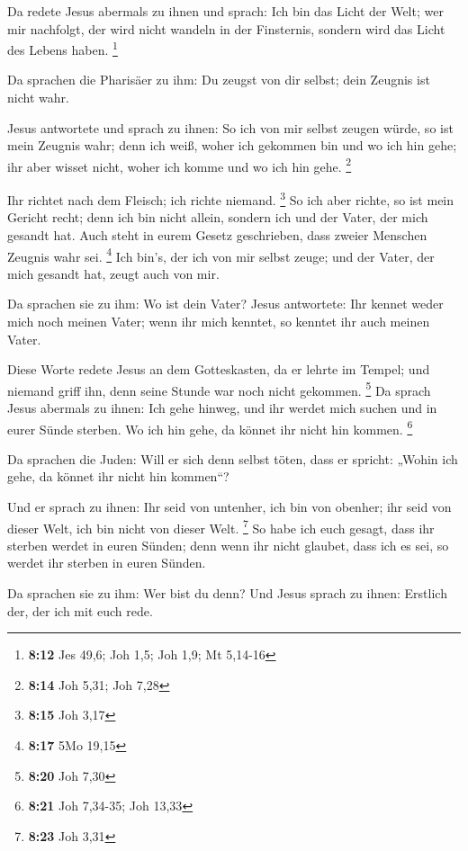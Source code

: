  Da redete Jesus abermals zu ihnen und sprach: Ich bin das
Licht der Welt; wer mir nachfolgt, der wird nicht wandeln in der
Finsternis, sondern wird das Licht des Lebens haben. \footnote{\textbf{8:12}
  Jes 49,6; Joh 1,5; Joh 1,9; Mt 5,14-16}

 Da sprachen die Pharisäer zu ihm: Du zeugst von dir
selbst; dein Zeugnis ist nicht wahr.

 Jesus antwortete und sprach zu ihnen: So ich von mir
selbst zeugen würde, so ist mein Zeugnis wahr; denn ich weiß, woher ich
gekommen bin und wo ich hin gehe; ihr aber wisset nicht, woher ich komme
und wo ich hin gehe. \footnote{\textbf{8:14} Joh 5,31; Joh 7,28}

 Ihr richtet nach dem Fleisch; ich richte niemand.
\footnote{\textbf{8:15} Joh 3,17}  So ich aber richte, so
ist mein Gericht recht; denn ich bin nicht allein, sondern ich und der
Vater, der mich gesandt hat.  Auch steht in eurem Gesetz
geschrieben, dass zweier Menschen Zeugnis wahr sei. \footnote{\textbf{8:17}
  5Mo 19,15}  Ich bin's, der ich von mir selbst zeuge; und
der Vater, der mich gesandt hat, zeugt auch von mir.

 Da sprachen sie zu ihm: Wo ist dein Vater? Jesus
antwortete: Ihr kennet weder mich noch meinen Vater; wenn ihr mich
kenntet, so kenntet ihr auch meinen Vater.

 Diese Worte redete Jesus an dem Gotteskasten, da er lehrte
im Tempel; und niemand griff ihn, denn seine Stunde war noch nicht
gekommen. \footnote{\textbf{8:20} Joh 7,30}  Da sprach
Jesus abermals zu ihnen: Ich gehe hinweg, und ihr werdet mich suchen und
in eurer Sünde sterben. Wo ich hin gehe, da könnet ihr nicht hin kommen.
\footnote{\textbf{8:21} Joh 7,34-35; Joh 13,33}

 Da sprachen die Juden: Will er sich denn selbst töten,
dass er spricht: „Wohin ich gehe, da könnet ihr nicht hin kommen``?

 Und er sprach zu ihnen: Ihr seid von untenher, ich bin von
obenher; ihr seid von dieser Welt, ich bin nicht von dieser Welt.
\footnote{\textbf{8:23} Joh 3,31}  So habe ich euch gesagt,
dass ihr sterben werdet in euren Sünden; denn wenn ihr nicht glaubet,
dass ich es sei, so werdet ihr sterben in euren Sünden.

 Da sprachen sie zu ihm: Wer bist du denn? Und Jesus sprach
zu ihnen: Erstlich der, der ich mit euch rede.

